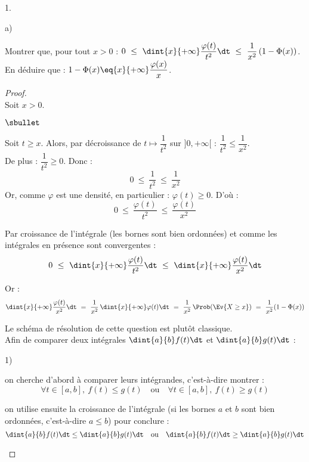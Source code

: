 \documentclass[11pt]{article}%
\begin{document}
\begin{noliste}{1.}
\begin{noliste}{a)}
    \item Montrer que, pour tout $x>0$ : $0 \ \leq \ \dint{x}{+\infty}  
    \dfrac{\varphi(t)}{t^2} \dt \ \leq \ \dfrac{1}{x^2}\, 
    (1-\Phi(x))$.\\
    En déduire que : $1-\Phi(x) \eq{x}{+\infty} 
    \dfrac{\varphi(x)}{x}$.
    
    \begin{proof}~\\
      Soit $x>0$.
      \begin{noliste}{$\sbullet$}
      \item Soit $t \geq x$. Alors, par décroissance de $t\mapsto 
      \dfrac{1}{t^2}$ sur $]0,+\infty[$ : $ \dfrac{1}{t^2} \leq 
      \dfrac{1}{x^2}$.\\
      De plus : $\dfrac{1}{t^2} \geq 0$. Donc : 
      \[
        0 \ \leq \ \dfrac{1}{t^2} \ \leq \ \dfrac{1}{x^2}
      \]
      Or, comme $\varphi$ est une densité, en particulier : 
      $\varphi(t) \geq 0$. D'où :
      \[
        0 \ \leq \ \dfrac{\varphi(t)}{t^2} \ \leq \ 
        \dfrac{\varphi(t)}{x^2}
      \]
      
    \item Par croissance de l'intégrale (les bornes sont bien
      ordonnées) et comme les intégrales en présence sont convergentes
      :
      \[
        0 \ \leq \ \dint{x}{+\infty} \dfrac{\varphi(t)}{t^2} \dt \
        \leq \ \dint{x}{+\infty} \dfrac{\varphi(t)}{x^2} \dt
      \]
      
      \item Or :
      \[
        \dint{x}{+\infty} \dfrac{\varphi(t)}{x^2} \dt \ = \
        \dfrac{1}{x^2} \, \dint{x}{+\infty} \varphi(t) \dt \ = \
        \dfrac{1}{x^2} \, \Prob(\Ev{X \geq x}) \ = \
        \dfrac{1}{x^2} (1-\Phi(x))
      \]
      \end{noliste}
      
      
      \newpage
      
      
      \begin{remark}
        Le schéma de résolution de cette question est plutôt 
	classique.\\
        Afin de comparer deux intégrales $\dint{a}{b} f(t) \dt$ et 
        $\dint{a}{b} g(t) \dt$ :
        \begin{noliste}{\scriptsize 1)}
	  \item on cherche d'abord à comparer leurs 
	  intégrandes, c'est-à-dire montrer :
	  \[
	    \forall t \in [a,b], \ f(t) \leq g(t) \quad \text{ou} \quad 
	    \forall t \in [a,b], \ f(t) \geq g(t)
	  \]
	  \item on utilise ensuite la croissance de l'intégrale (si 
	  les bornes $a$ et $b$ sont bien ordonnées, c'est-à-dire 
	  $a \leq b$) pour conclure :
	  \[
	    \dint{a}{b} f(t) \dt \leq \dint{a}{b} g(t) \dt \quad 
	    \text{ou} \quad \dint{a}{b} f(t) \dt \geq 
	    \dint{a}{b} g(t) \dt
	  \]
        \end{noliste}
      \end{remark}
      

\end{proof}
\end{noliste}
\end{noliste}
\end{document}
